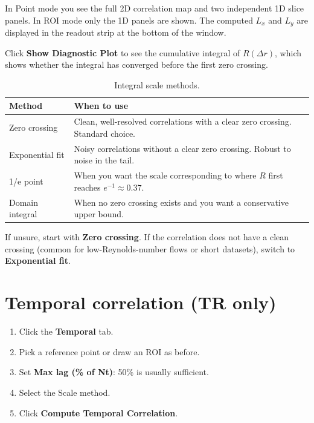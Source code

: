 \documentclass[11pt, a4paper]{report}
\newcommand{\uipth}[1]{\textbf{\textcolor{upblue}{#1}}}
\begin{document}
In Point mode you see the full 2D correlation map and two independent 1D slice panels. In ROI mode only the 1D panels are shown. The computed $L_x$ and $L_y$ are displayed in the readout strip at the bottom of the window.

Click \uipth{Show Diagnostic Plot} to see the cumulative integral of $R(\Delta r)$, which shows whether the integral has converged before the first zero crossing.

\begin{table}[htbp]
\centering
\caption{Integral scale methods.}
\label{tab:scalemethods}
\begin{tabular}{lp{9cm}}
\toprule
\textbf{Method} & \textbf{When to use} \\
\midrule
Zero crossing   & Clean, well-resolved correlations with a clear zero crossing. Standard choice. \\
Exponential fit & Noisy correlations without a clear zero crossing. Robust to noise in the tail. \\
1/e point       & When you want the scale corresponding to where $R$ first reaches $e^{-1} \approx 0.37$. \\
Domain integral & When no zero crossing exists and you want a conservative upper bound. \\
\bottomrule
\end{tabular}
\end{table}

\begin{tipbox}
If unsure, start with \textbf{Zero crossing}. If the correlation does not have a clean crossing (common for low-Reynolds-number flows or short datasets), switch to \textbf{Exponential fit}.
\end{tipbox}

\section{Temporal correlation (TR only)}

\begin{stepbox}
\begin{enumerate}[leftmargin=1.5em, topsep=2pt]
  \item Click the \uipth{Temporal} tab.
  \item Pick a reference point or draw an ROI as before.
  \item Set \uipth{Max lag (\% of Nt)}: 50\% is usually sufficient.
  \item Select the Scale method.
  \item Click \uipth{Compute Temporal Correlation}.
\end{enumerate}
\end{stepbox}
\end{document}
